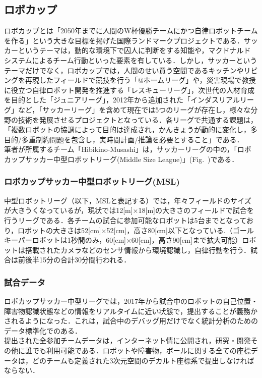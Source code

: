 \subsection{ロボカップ}%
ロボカップとは「2050年までに人間のW杯優勝チームにかつ自律ロボットチームを作る」という大きな目標を掲げた国際ランドマークプロジェクトである．サッカーというテーマは，動的な環境下で囚人に判断をする知能や，マクドナルド システムによるチーム行動といった要素を有している．しかし，サッカーというテーマだけでなく，ロボカップでは，人間のせい買う空間であるキッチンやリビングを再現したフィールドで競技を行う「@ホームリーグ」や，災害現場で教授に役立つ自律ロボット開発を推進する「レスキューリーグ」，次世代の人材育成を目的とした「ジュニアリーグ」，2012年から追加された「インダスリアルリーグ」など，「サッカーリーグ」を含めて現在では5つのリーグが存在し，様々な分野の技術を発展させるプロジェクトとなっている．各リーグで共通する課題は，「複数ロボットの協調によって目的は達成され，かんきょうが動的に変化し，多目的/多重制約問題を包含し，実時間計画/推論を必要とすること」である．\\
筆者が所属するチーム「Hibikino-Musashi」は，サッカーリーグの中の，「ロボカップサッカー中型ロボットリーグ(Middle Size League)」(Fig.~)である．

\subsubsection{ロボカップサッカー中型ロボットリーグ(MSL)}
中型ロボットリーグ（以下，MSLと表記する）では，年々フィールドのサイズが大きうくなっているが，現状では12[m]×18[m]の大きさのフィールドで試合を行うリーグである．各チームの試合に参加可能なロボットは5台までとなっており，ロボットの大きさは52[cm]×52[cm]，高さ80[cm]以下となっている.（ゴールキーパーロボットは1秒間のみ，60[cm]×60[cm]，高さ90[cm]まで拡大可能）ロボットは搭載されたカメラなどのセンサ情報から環境認識し，自律行動を行う．試合は前後半15分の合計30分間行われる．

\subsubsection{試合データ}
ロボカップサッカー中型リーグでは，2017年から試合中のロボットの自己位置・障害物認識状態などの情報をリアルタイムに近い状態で，提出することが義務かされるようになった．これは，試合中のデバッグ用だけでなく統計分析のためのデータ標準化でのある．\\
提出された全参加チームデータは，インターネット情に公開され，研究・開発その他に誰でも利用可能である．ロボットや障害物，ボールに関する全ての座標データは，どのチームも定義された3次元空間のデカルト座標系で提出しなければならない．

